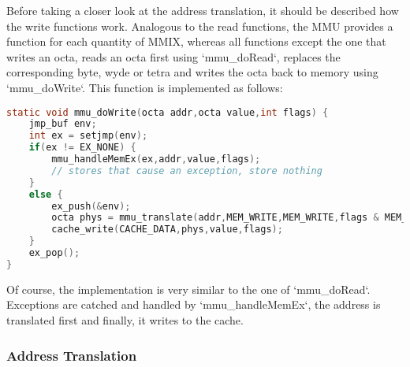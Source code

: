 Before taking a closer look at the address translation, it should be described how the write functions work. Analogous to the read functions, the MMU provides a function for each quantity of MMIX, whereas all functions except the one that writes an octa, reads an octa first using `mmu_doRead`, replaces the corresponding byte, wyde or tetra and writes the octa back to memory using `mmu_doWrite`. This function is implemented as follows:
\begin{lstlisting}[language=C,caption={Implementation of {\tt mmu\_doWrite}}]
static void mmu_doWrite(octa addr,octa value,int flags) {
	jmp_buf env;
	int ex = setjmp(env);
	if(ex != EX_NONE) {
		mmu_handleMemEx(ex,addr,value,flags);
		// stores that cause an exception, store nothing
	}
	else {
		ex_push(&env);
		octa phys = mmu_translate(addr,MEM_WRITE,MEM_WRITE,flags & MEM_SIDE_EFFECTS);
		cache_write(CACHE_DATA,phys,value,flags);
	}
	ex_pop();
}
\end{lstlisting}
Of course, the implementation is very similar to the one of `mmu_doRead`. Exceptions are catched and handled by `mmu_handleMemEx`, the address is translated first and finally, it writes to the cache.

\subsubsection{Address Translation}

